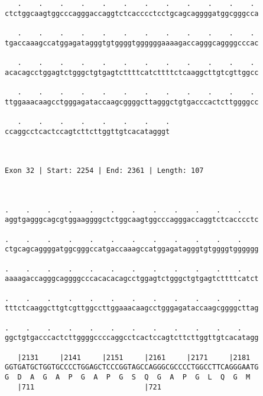 \documentclass{article}
\begin{document}
\begin{Verbatim}
   .    .    .    .    .    .    .    .    .    .    .    . 
ctctggcaagtggcccagggaccaggtctcacccctcctgcagcaggggatggcgggcca
                                                            
   .    .    .    .    .    .    .    .    .    .    .    . 
tgaccaaagccatggagatagggtgtggggtggggggaaaagaccagggcaggggcccac
                                                            
   .    .    .    .    .    .    .    .    .    .    .    . 
acacagcctggagtctgggctgtgagtcttttcatcttttctcaaggcttgtcgttggcc
                                                            
   .    .    .    .    .    .    .    .    .    .    .    . 
ttggaaacaagcctgggagataccaagcggggcttagggctgtgacccactcttggggcc
                                                            
   .    .    .    .    .    .    .    .
ccaggcctcactccagtcttcttggttgtcacatagggt
                                       
                                       
 
Exon 32 | Start: 2254 | End: 2361 | Length: 107



.    .    .    .    .    .    .    .    .    .    .    .    
aggtgagggcagcgtggaaggggctctggcaagtggcccagggaccaggtctcacccctc
                                                            
.    .    .    .    .    .    .    .    .    .    .    .    
ctgcagcaggggatggcgggccatgaccaaagccatggagatagggtgtggggtgggggg
                                                            
.    .    .    .    .    .    .    .    .    .    .    .    
aaaagaccagggcaggggcccacacacagcctggagtctgggctgtgagtcttttcatct
                                                            
.    .    .    .    .    .    .    .    .    .    .    .    
tttctcaaggcttgtcgttggccttggaaacaagcctgggagataccaagcggggcttag
                                                            
.    .    .    .    .    .    .    .    .    .    .    .    
ggctgtgacccactcttggggccccaggcctcactccagtcttcttggttgtcacatagg
                                                            
   |2131     |2141     |2151     |2161     |2171     |2181  
GGTGATGCTGGTGCCCCTGGAGCTCCCGGTAGCCAGGGCGCCCCTGGCCTTCAGGGAATG
G  D  A  G  A  P  G  A  P  G  S  Q  G  A  P  G  L  Q  G  M  
   |711                          |721                       
  

\end{Verbatim}
\end{document}
